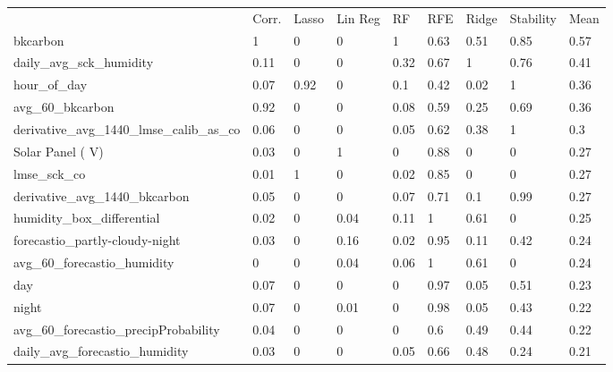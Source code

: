\begin{table}[htb]
\centering
\small
\begin{tabular}{lllllllll}
\\
\\
\toprule
     & Corr. & Lasso & Lin Reg & RF   & RFE  & Ridge & Stability & Mean \\
\midrule
bkcarbon                                   & 1     & 0          & 0    & 1    & 0.63  & 0.51      & 0.85 & 0.57 \\
daily\_avg\_sck\_humidity                  & 0.11  & 0          & 0    & 0.32 & 0.67  & 1         & 0.76 & 0.41 \\
hour\_of\_day                              & 0.07  & 0.92       & 0    & 0.1  & 0.42  & 0.02      & 1    & 0.36 \\
avg\_60\_bkcarbon                          & 0.92  & 0          & 0    & 0.08 & 0.59  & 0.25      & 0.69 & 0.36 \\
derivative\_avg\_1440\_lmse\_calib\_as\_co & 0.06  & 0          & 0    & 0.05 & 0.62  & 0.38      & 1    & 0.3  \\
Solar Panel ( V)                           & 0.03  & 0          & 1    & 0    & 0.88  & 0         & 0    & 0.27 \\
lmse\_sck\_co                              & 0.01  & 1          & 0    & 0.02 & 0.85  & 0         & 0    & 0.27 \\
derivative\_avg\_1440\_bkcarbon            & 0.05  & 0          & 0    & 0.07 & 0.71  & 0.1       & 0.99 & 0.27 \\
humidity\_box\_differential                & 0.02  & 0          & 0.04 & 0.11 & 1     & 0.61      & 0    & 0.25 \\
forecastio\_partly-cloudy-night            & 0.03  & 0          & 0.16 & 0.02 & 0.95  & 0.11      & 0.42 & 0.24 \\
avg\_60\_forecastio\_humidity              & 0     & 0          & 0.04 & 0.06 & 1     & 0.61      & 0    & 0.24 \\
day                                        & 0.07  & 0          & 0    & 0    & 0.97  & 0.05      & 0.51 & 0.23 \\
night                                      & 0.07  & 0          & 0.01 & 0    & 0.98  & 0.05      & 0.43 & 0.22 \\
avg\_60\_forecastio\_precipProbability     & 0.04  & 0          & 0    & 0    & 0.6   & 0.49      & 0.44 & 0.22 \\
daily\_avg\_forecastio\_humidity           & 0.03  & 0          & 0    & 0.05 & 0.66  & 0.48      & 0.24 & 0.21 \\

\end{tabular}
\end{table}
